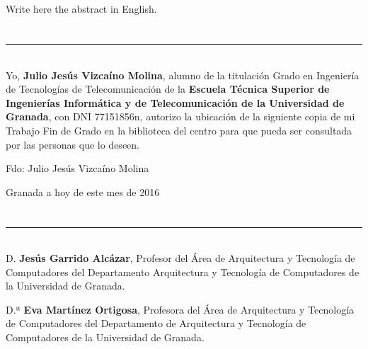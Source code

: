 \\

\vspace{0.7cm}
\\

Write here the abstract in English.

\chapter*{}
\thispagestyle{empty}

\noindent\rule[-1ex]{\textwidth}{2pt}\\[4.5ex]

Yo, \textbf{Julio Jesús Vizcaíno Molina}, alumno de la titulación Grado en Ingeniería de Tecnologías de Telecomunicación de la \textbf{Escuela Técnica Superior de Ingenierías Informática y de Telecomunicación de la Universidad de Granada}, con DNI 77151856n, autorizo la ubicación de la siguiente copia de mi Trabajo Fin de Grado en la biblioteca del centro para que pueda ser consultada por las personas que lo deseen.

\vspace{6cm}

\noindent Fdo: Julio Jesús Vizcaíno Molina

\vspace{2cm}

\begin{flushright}
Granada a hoy de este mes de 2016
\end{flushright}


\chapter*{}
\thispagestyle{empty}

\noindent\rule[-1ex]{\textwidth}{2pt}\\[4.5ex]

D. \textbf{Jesús Garrido Alcázar}, Profesor del Área de Arquitectura y Tecnología de Computadores del Departamento Arquitectura y Tecnología de Computadores de la Universidad de Granada.

\vspace{0.5cm}

D.ª \textbf{Eva Martínez Ortigosa}, Profesora del Área de Arquitectura y Tecnología de Computadores del Departamento de Arquitectura y Tecnología de Computadores de la Universidad de Granada.


